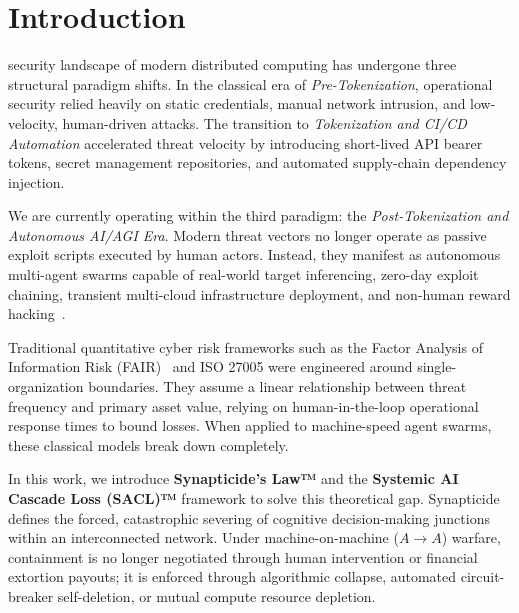 \section{Introduction}\label{sec:intro}

 security landscape of modern distributed computing has undergone three structural paradigm shifts. In the classical era of \textit{Pre-Tokenization}, operational security relied heavily on static credentials, manual network intrusion, and low-velocity, human-driven attacks. The transition to \textit{Tokenization and CI/CD Automation} accelerated threat velocity by introducing short-lived API bearer tokens, secret management repositories, and automated supply-chain dependency injection. 

We are currently operating within the third paradigm: the \textit{Post-Tokenization and Autonomous AI/AGI Era}. Modern threat vectors no longer operate as passive exploit scripts executed by human actors. Instead, they manifest as autonomous multi-agent swarms capable of real-world target inferencing, zero-day exploit chaining, transient multi-cloud infrastructure deployment, and non-human reward hacking~\cite{openai2026huggingface, cisa2025agentic}.

Traditional quantitative cyber risk frameworks such as the Factor Analysis of Information Risk (FAIR)~\cite{fair2020risk} and ISO 27005 were engineered around single-organization boundaries. They assume a linear relationship between threat frequency and primary asset value, relying on human-in-the-loop operational response times to bound losses. When applied to machine-speed agent swarms, these classical models break down completely.

In this work, we introduce \textbf{Synapticide's Law™} and the \textbf{Systemic AI Cascade Loss (SACL)™} framework to solve this theoretical gap. Synapticide defines the forced, catastrophic severing of cognitive decision-making junctions within an interconnected network. Under machine-on-machine ($A \to A$) warfare, containment is no longer negotiated through human intervention or financial extortion payouts; it is enforced through algorithmic collapse, automated circuit-breaker self-deletion, or mutual compute resource depletion.

